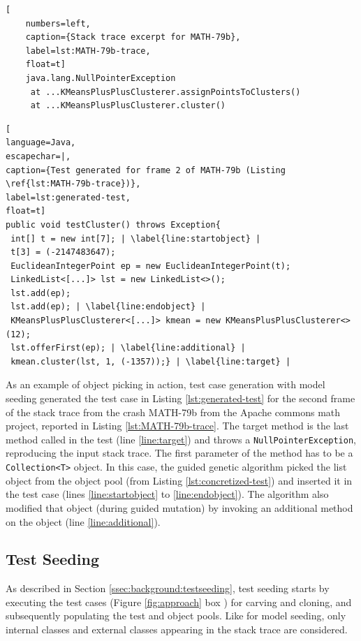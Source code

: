 \begin{lstlisting}[
    numbers=left,
    caption={Stack trace excerpt for MATH-79b},
    label=lst:MATH-79b-trace,
    float=t]
    java.lang.NullPointerException
     at ...KMeansPlusPlusClusterer.assignPointsToClusters()
     at ...KMeansPlusPlusClusterer.cluster()
    \end{lstlisting}

\begin{lstlisting}[
language=Java,
escapechar=|,
caption={Test generated for frame 2 of MATH-79b (Listing \ref{lst:MATH-79b-trace})},
label=lst:generated-test,
float=t]
public void testCluster() throws Exception{
 int[] t = new int[7]; | \label{line:startobject} |
 t[3] = (-2147483647);
 EuclideanIntegerPoint ep = new EuclideanIntegerPoint(t);
 LinkedList<[...]> lst = new LinkedList<>();
 lst.add(ep);
 lst.add(ep); | \label{line:endobject} |
 KMeansPlusPlusClusterer<[...]> kmean = new KMeansPlusPlusClusterer<>(12);
 lst.offerFirst(ep); | \label{line:additional} |
 kmean.cluster(lst, 1, (-1357));} | \label{line:target} |
\end{lstlisting}



As an example of object picking in action, test case generation with model seeding generated the test case in Listing \ref{lst:generated-test} for the second frame of the stack trace from the crash MATH-79b from the Apache commons math project, reported in Listing \ref{lst:MATH-79b-trace}.
%
The target method is the last method called in the test (line \ref{line:target}) and throws a \texttt{NullPointerException}, reproducing the input stack trace. The first parameter of the method has to be a \texttt{Collection<T>} object. In this case, the guided genetic algorithm picked the list object from the object pool (from Listing \ref{lst:concretized-test}) and inserted it in the test case (lines \ref{line:startobject} to \ref{line:endobject}). The algorithm also modified that object (during guided mutation) by invoking an additional method on the object (line \ref{line:additional}).

 \subsection{Test Seeding}

As described in Section \ref{ssec:background:testseeding}, test seeding starts by executing the test cases (Figure \ref{fig:approach} box ) for carving and cloning, and subsequently populating the test and object pools. Like for model seeding, only internal classes and external classes appearing in the stack trace are considered.

